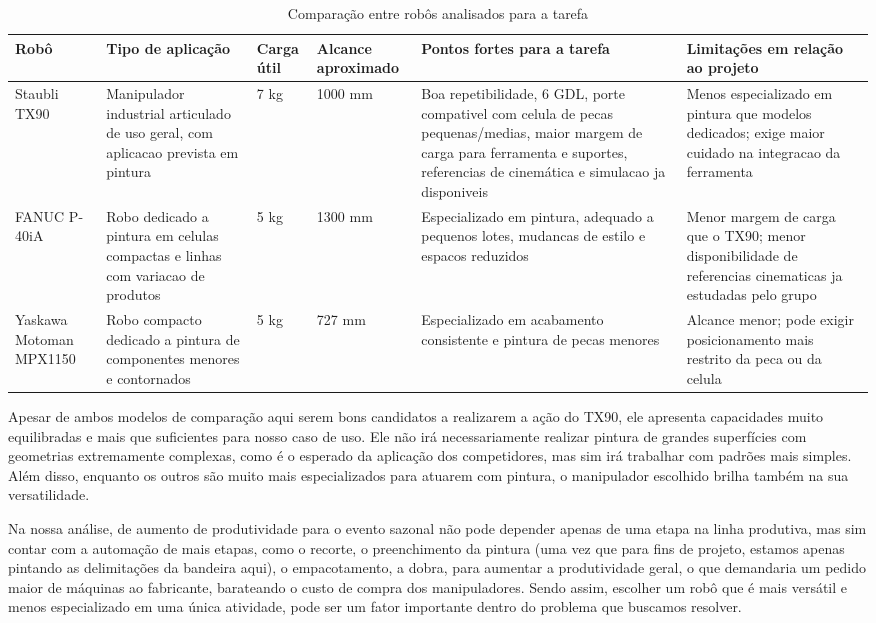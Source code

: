 \begin{table}[H]
\centering
\small
\caption{Comparação entre robôs analisados para a tarefa}
\begin{tabularx}{\textwidth}{|p{2.2cm}|p{3.1cm}|p{1.3cm}|p{1.7cm}|X|X|}
\hline
 \textbf{Robô} & \textbf{Tipo de aplicação} & \textbf{Carga útil} & \textbf{Alcance aproximado} & \textbf{Pontos fortes para a tarefa} & \textbf{Limitações em relação ao projeto} \\ \hline
 Staubli TX90 & Manipulador industrial articulado de uso geral, com aplicacao prevista em pintura & 7 kg & 1000 mm & Boa repetibilidade, 6 GDL, porte compativel com celula de pecas pequenas/medias, maior margem de carga para ferramenta e suportes, referencias de cinemática e simulacao ja disponiveis & Menos especializado em pintura que modelos dedicados; exige maior cuidado na integracao da ferramenta \\ \hline
 FANUC P-40iA & Robo dedicado a pintura em celulas compactas e linhas com variacao de produtos & 5 kg & 1300 mm & Especializado em pintura, adequado a pequenos lotes, mudancas de estilo e espacos reduzidos & Menor margem de carga que o TX90; menor disponibilidade de referencias cinematicas ja estudadas pelo grupo \\ \hline
 Yaskawa Motoman MPX1150 & Robo compacto dedicado a pintura de componentes menores e contornados & 5 kg & 727 mm & Especializado em acabamento consistente e pintura de pecas menores & Alcance menor; pode exigir posicionamento mais restrito da peca ou da celula \\ \hline
\end{tabularx}
\end{table}



Apesar de ambos modelos de comparação aqui serem bons candidatos a realizarem a ação do TX90, ele apresenta capacidades muito equilibradas e mais que suficientes para nosso caso de uso. Ele não irá necessariamente realizar pintura de grandes superfícies com geometrias extremamente complexas, como é o esperado da aplicação dos competidores, mas sim irá trabalhar com padrões mais simples. Além disso, enquanto os outros são muito mais especializados para atuarem com pintura, o manipulador escolhido brilha também na sua versatilidade. 

Na nossa análise, de aumento de produtividade para o evento sazonal não pode depender apenas de uma etapa na linha produtiva, mas sim contar com a automação de mais etapas, como o recorte, o preenchimento da pintura (uma vez que para fins de projeto, estamos apenas pintando as delimitações da bandeira aqui), o empacotamento, a dobra, para aumentar a produtividade geral, o que demandaria um pedido maior de máquinas ao fabricante, barateando o custo de compra dos manipuladores. Sendo assim, escolher um robô que é mais versátil e menos especializado em uma única atividade, pode ser um fator importante dentro do problema que buscamos resolver.

